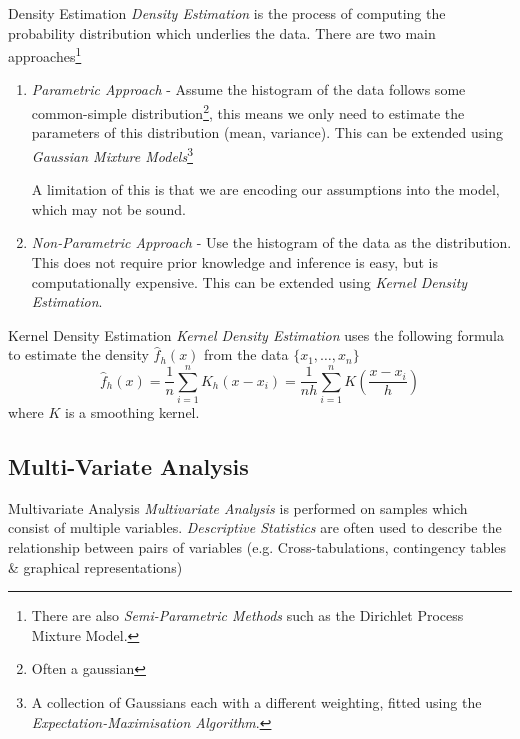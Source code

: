 \documentclass[11pt,a4paper]{article}
\begin{document}
  \begin{definition}{Density Estimation}
    \textit{Density Estimation} is the process of computing the probability distribution which underlies the data. There are two main approaches\footnote{There are also \textit{Semi-Parametric Methods} such as the Dirichlet Process Mixture Model.}
    \begin{enumerate}
      \item \textit{Parametric Approach} - Assume the histogram of the data follows some common-simple distribution\footnote{Often a gaussian}, this means we only need to estimate the parameters of this distribution (mean, variance). This can be extended using \textit{Gaussian Mixture Models}\footnote{A collection of Gaussians each with a different weighting, fitted using the \textit{Expectation-Maximisation Algorithm}.}
      \par A limitation of this is that we are encoding our assumptions into the model, which may not be sound.
      \item \textit{Non-Parametric Approach} - Use the histogram of the data as the distribution. This does not require prior knowledge and inference is easy, but is computationally expensive. This can be extended using \textit{Kernel Density Estimation}.
    \end{enumerate}
  \end{definition}

  \begin{definition}{Kernel Density Estimation}
    \textit{Kernel Density Estimation} uses the following formula to estimate the density $\hat{f}_h(x)$ from the data $\{x_1,\dots,x_n\}$
    \[ \hat{f}_h(x)=\frac1n\sum_{i=1}^nK_h(x-x_i)=\frac1{nh}\sum_{i=1}^nK\left(\frac{x-x_i}h\right) \]
    where $K$ is a smoothing kernel.
  \end{definition}

\subsection{Multi-Variate Analysis}

  \begin{definition}{Multivariate Analysis}
    \textit{Multivariate Analysis} is performed on samples which consist of multiple variables. \textit{Descriptive Statistics} are often used to describe the relationship between pairs of variables (e.g. Cross-tabulations, contingency tables \& graphical representations)
  \end{definition}
\end{document}
